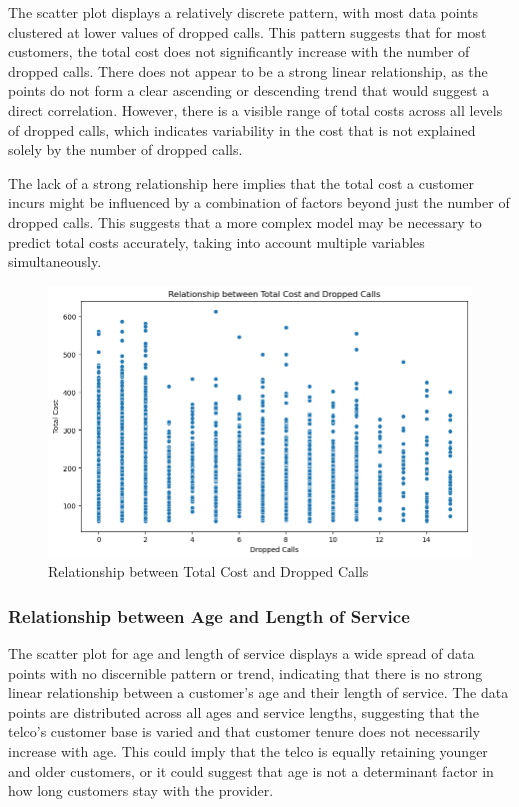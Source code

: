 \documentclass{article}
\begin{document}
The scatter plot displays a relatively discrete pattern, with most data points clustered at lower values of dropped calls. This pattern suggests that for most customers, the total cost does not significantly increase with the number of dropped calls. There does not appear to be a strong linear relationship, as the points do not form a clear ascending or descending trend that would suggest a direct correlation. However, there is a visible range of total costs across all levels of dropped calls, which indicates variability in the cost that is not explained solely by the number of dropped calls.

The lack of a strong relationship here implies that the total cost a customer incurs might be influenced by a combination of factors beyond just the number of dropped calls. This suggests that a more complex model may be necessary to predict total costs accurately, taking into account multiple variables simultaneously.

\begin{figure}[h]
\centering
\includegraphics[width=0.4\linewidth]{Relationship between Total Cost and Dropped Calls.png}
\caption{Relationship between Total Cost and Dropped Calls}
\label{fig:distribution}
\end{figure}


\subsubsection{Relationship between Age and Length of Service}

The scatter plot for age and length of service displays a wide spread of data points with no discernible pattern or trend, indicating that there is no strong linear relationship between a customer's age and their length of service. The data points are distributed across all ages and service lengths, suggesting that the telco's customer base is varied and that customer tenure does not necessarily increase with age. This could imply that the telco is equally retaining younger and older customers, or it could suggest that age is not a determinant factor in how long customers stay with the provider.
\end{document}
